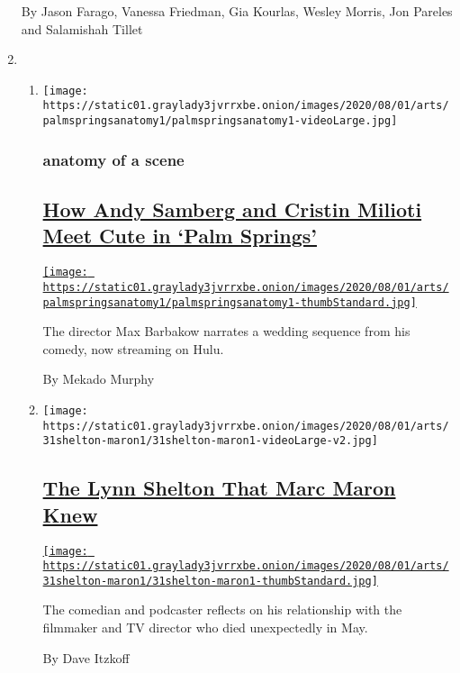\begin{enumerate}
  By Jason Farago, Vanessa Friedman, Gia Kourlas, Wesley Morris, Jon
  Pareles and Salamishah Tillet
\item
  \begin{enumerate}
  \def\labelenumii{\arabic{enumii}.}
  \item
    \texttt{[image: https://static01.graylady3jvrrxbe.onion/images/2020/08/01/arts/palmspringsanatomy1/palmspringsanatomy1-videoLarge.jpg]}

    \hypertarget{anatomy-of-a-scene}{%
    \subsubsection{anatomy of a scene}\label{anatomy-of-a-scene}}

    \hypertarget{how-andy-samberg-and-cristin-milioti-meet-cute-in-palm-springs}{%
    \subsection{\texorpdfstring{\href{/2020/07/31/movies/palm-springs-clip-hulu.html}{How
    Andy Samberg and Cristin Milioti Meet Cute in `Palm
    Springs'}}{How Andy Samberg and Cristin Milioti Meet Cute in `Palm Springs'}}\label{how-andy-samberg-and-cristin-milioti-meet-cute-in-palm-springs}}

    \href{/2020/07/31/movies/palm-springs-clip-hulu.html}{\texttt{[image: https://static01.graylady3jvrrxbe.onion/images/2020/08/01/arts/palmspringsanatomy1/palmspringsanatomy1-thumbStandard.jpg]}}

    The director Max Barbakow narrates a wedding sequence from his
    comedy, now streaming on Hulu.

    By Mekado Murphy
  \item
    \texttt{[image: https://static01.graylady3jvrrxbe.onion/images/2020/08/01/arts/31shelton-maron1/31shelton-maron1-videoLarge-v2.jpg]}

    \hypertarget{the-lynn-shelton-that-marc-maron-knew}{%
    \subsection{\texorpdfstring{\href{/2020/07/31/movies/marc-maron-lynn-shelton.html}{The
    Lynn Shelton That Marc Maron
    Knew}}{The Lynn Shelton That Marc Maron Knew}}\label{the-lynn-shelton-that-marc-maron-knew}}

    \href{/2020/07/31/movies/marc-maron-lynn-shelton.html}{\texttt{[image: https://static01.graylady3jvrrxbe.onion/images/2020/08/01/arts/31shelton-maron1/31shelton-maron1-thumbStandard.jpg]}}

    The comedian and podcaster reflects on his relationship with the
    filmmaker and TV director who died unexpectedly in May.

    By Dave Itzkoff
  \end{enumerate}
\end{enumerate}

